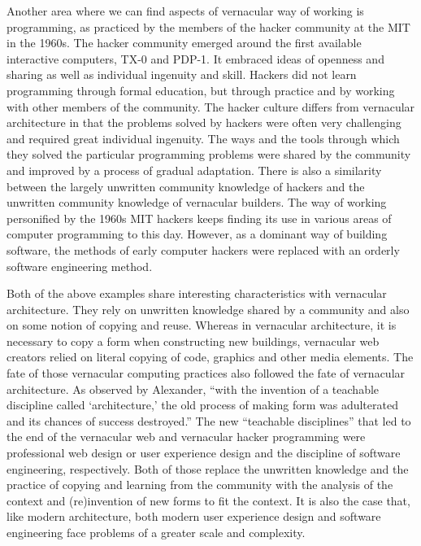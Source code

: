 Another area where we can find aspects of vernacular way of working is programming, as practiced
by the members of the hacker community at the MIT in the 1960s. The hacker community emerged around
the first available interactive computers, TX-0 and PDP-1. It embraced ideas of openness and
sharing as well as individual ingenuity and skill. Hackers did not learn programming
through formal education, but through practice and by working with other members of the community.
The hacker culture differs from vernacular architecture in that the problems solved by hackers
were often very challenging and required great individual ingenuity. The ways and the tools
through which they solved the particular programming problems were shared by the community
and improved by a process of gradual adaptation. There is also a
similarity between the largely unwritten community knowledge of hackers
and the unwritten community knowledge of vernacular builders. The way of working
personified by the 1960s MIT hackers keeps finding its use in various areas of computer programming
to this day. However, as a dominant way of building software,
the methods of early computer hackers were replaced with an orderly software engineering
method.

Both of the above examples share interesting characteristics with vernacular architecture.
They rely on unwritten knowledge shared by a community and also on some notion of copying
and reuse. Whereas in vernacular architecture, it is necessary to copy a form when constructing
new buildings, vernacular web creators relied on literal copying of code, graphics and other
media elements. The fate of those vernacular computing practices also followed the fate of
vernacular architecture. As observed by Alexander, ``with the invention of a teachable discipline
called `architecture,'  the old process of making form was adulterated and its chances of success
destroyed.'' The new ``teachable disciplines'' that led to the end of the
vernacular web and vernacular hacker programming were professional web design or user experience
design and the discipline of software engineering, respectively. Both of those replace the
unwritten knowledge and the practice of copying and learning from the community with the
analysis of the context and (re)invention of new forms to fit the context. It is also the case that,
like modern architecture, both modern user experience design and software engineering face problems
of a greater scale and complexity.

